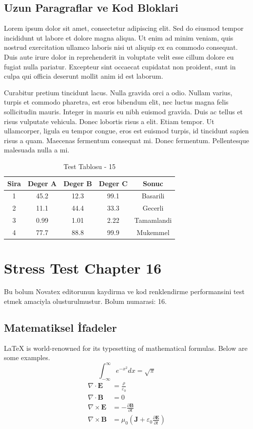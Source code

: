 \documentclass[12pt,a4paper]{article}
\begin{document}
\subsection{Uzun Paragraflar ve Kod Bloklari}
Lorem ipsum dolor sit amet, consectetur adipiscing elit. Sed do eiusmod tempor incididunt ut labore et dolore magna aliqua. Ut enim ad minim veniam, quis nostrud exercitation ullamco laboris nisi ut aliquip ex ea commodo consequat. Duis aute irure dolor in reprehenderit in voluptate velit esse cillum dolore eu fugiat nulla pariatur. Excepteur sint occaecat cupidatat non proident, sunt in culpa qui officia deserunt mollit anim id est laborum.

Curabitur pretium tincidunt lacus. Nulla gravida orci a odio. Nullam varius, turpis et commodo pharetra, est eros bibendum elit, nec luctus magna felis sollicitudin mauris. Integer in mauris eu nibh euismod gravida. Duis ac tellus et risus vulputate vehicula. Donec lobortis risus a elit. Etiam tempor. Ut ullamcorper, ligula eu tempor congue, eros est euismod turpis, id tincidunt sapien risus a quam. Maecenas fermentum consequat mi. Donec fermentum. Pellentesque malesuada nulla a mi.

\begin{table}[h!]
\centering
\begin{tabular}{|c|c|c|c|c|}
\hline
\textbf{Sira} & \textbf{Deger A} & \textbf{Deger B} & \textbf{Deger C} & \textbf{Sonuc} \\
\hline
1 & 45.2 & 12.3 & 99.1 & Basarili \\
2 & 11.1 & 44.4 & 33.3 & Gecerli \\
3 & 0.99 & 1.01 & 2.22 & Tamamlandi \\
4 & 77.7 & 88.8 & 99.9 & Mukemmel \\
\hline
\end{tabular}
\caption{Test Tablosu - 15}
\end{table}

\newpage
\section{Stress Test Chapter 16}
Bu bolum Novatex editorunun kaydirma ve kod renklendirme performansini test etmek amaciyla olusturulmustur. Bolum numarasi: 16.

\subsection{Matematiksel İfadeler}
\LaTeX{} is world-renowned for its typesetting of mathematical formulas. Below are some examples.
\begin{equation}
\int_{-\infty}^{\infty} e^{-x^2} dx = \sqrt{\pi}
\end{equation}
\begin{align}
\nabla \cdot \mathbf{E} &= \frac{\rho}{\varepsilon_0} \\
\nabla \cdot \mathbf{B} &= 0 \\
\nabla \times \mathbf{E} &= -\frac{\partial \mathbf{B}}{\partial t} \\
\nabla \times \mathbf{B} &= \mu_0\left(\mathbf{J} + \varepsilon_0 \frac{\partial \mathbf{E}}{\partial t}\right)
\end{align}
\end{document}
